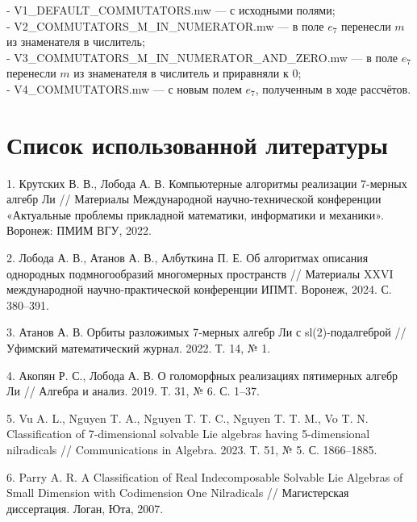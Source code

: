 \documentclass[12pt]{article}
\begin{document}
- V1_DEFAULT_COMMUTATORS.mw — с исходными полями; \\

- V2_COMMUTATORS_M_IN_NUMERATOR.mw — в поле $e_7$ перенесли $m$ из знаменателя в числитель; \\

- V3_COMMUTATORS_M_IN_NUMERATOR_AND_ZERO.mw — в поле $e_7$ перенесли $m$ из знаменателя в числитель и приравняли к 0; \\

- V4_COMMUTATORS.mw — с новым полем $e_7$, полученным в ходе рассчётов.

\pagebreak
\section{Список использованной литературы}

1. Крутских В. В., Лобода А. В. Компьютерные алгоритмы реализации 7-мерных алгебр Ли // Материалы Международной научно-технической конференции «Актуальные проблемы прикладной математики, информатики и механики». Воронеж: ПМИМ ВГУ, 2022.

2. Лобода А. В., Атанов А. В., Албуткина П. Е. Об алгоритмах описания однородных подмногообразий многомерных пространств // Материалы XXVI международной научно-практической конференции ИПМТ. Воронеж, 2024. С. 380–391.

3. Атанов А. В. Орбиты разложимых 7-мерных алгебр Ли с sl(2)-подалгеброй // Уфимский математический журнал. 2022. Т. 14, № 1.

4. Акопян Р. С., Лобода А. В. О голоморфных реализациях пятимерных алгебр Ли // Алгебра и анализ. 2019. Т. 31, № 6. С. 1–37. 

5. Vu A. L., Nguyen T. A., Nguyen T. T. C., Nguyen T. T. M., Vo T. N. Classification of 7-dimensional solvable Lie algebras having 5-dimensional nilradicals // Communications in Algebra. 2023. Т. 51, № 5. С. 1866–1885.

6. Parry A. R. A Classification of Real Indecomposable Solvable Lie Algebras of Small Dimension with Codimension One Nilradicals // Магистерская диссертация. Логан, Юта, 2007.
\end{document}
